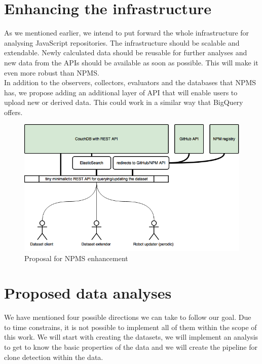 \documentclass[thesis=M,english]{FITthesis}[2012/10/20]
\begin{document}
\section{Enhancing the infrastructure}

As we mentioned earlier, we intend to put forward the whole infrastructure for analysing JavaScript repositories. The infrastructure should be scalable and extendable. Newly calculated data should be reusable for further analyses and new data from the APIs should be available as soon as possible. This will make it even more robust than NPMS. \\

In addition to the observers, collectors, evaluators and the databases that NPMS has, we propose adding an additional layer of API that will enable users to upload new or derived data. This could work in a similar way that BigQuery offers. \\

\begin{center}
\begin{figure}[h!]
	\hspace*{0.5cm}\includegraphics[totalheight=205pt]{images/npms_alt.png}
	\caption{Proposal for NPMS enhancement}
	\label{fig: npm_counts}
\end{figure}
\end{center}


\section{Proposed data analyses}

We have mentioned four possible directions we can take to follow our goal. Due to time constrains, it is not possible to implement all of them within the scope of this work. We will start with creating the datasets, we will implement an analysis to get to know the basic properties of the data and we will create the pipeline for clone detection within the data.
\end{document}
